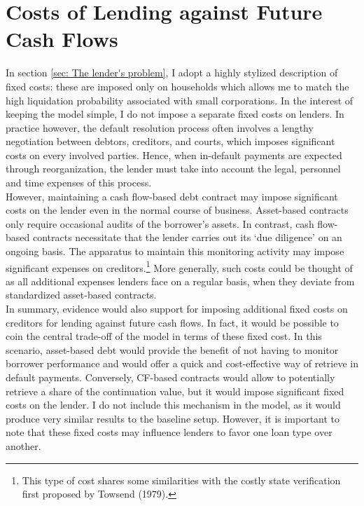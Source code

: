 \documentclass[12pt]{article}
\begin{document}
\section{Costs of Lending against Future Cash Flows \label{sec:fixed costs}}
In section \ref{sec: The lender's problem}, I adopt a highly stylized description of fixed costs: these are imposed only on households which allows me to match the high liquidation probability associated with small corporations. In the interest of keeping the model simple, I do not impose a separate fixed costs on lenders. In practice however, the default resolution process often involves a lengthy negotiation between debtors, creditors, and courts, which imposes significant costs on every involved parties. Hence, when in-default payments are expected through reorganization, the lender must take into account the legal, personnel and time expenses of this process. \vspace{3mm} \\
However, maintaining a cash flow-based debt contract may impose significant costs on the lender even in the normal course of business. Asset-based contracts only require occasional audits of the borrower's assets. In contrast, cash flow-based contracts necessitate that the lender carries out its `due diligence' on an ongoing basis. The apparatus to maintain this monitoring activity may impose significant expenses on creditors.\footnote{This type of cost shares some similarities with the costly state verification first proposed by Towsend (1979).} More generally, such costs could be thought of as all additional expenses lenders face on a regular basis, when they deviate from standardized asset-based contracts.
\vspace{3mm} \\
In summary, evidence would also support for imposing additional fixed costs on creditors for lending against future cash flows. In fact, it would be possible to coin the central trade-off of the model in terms of these fixed cost. In this scenario, asset-based debt would provide the benefit of not having to monitor borrower performance and would offer a quick and cost-effective way of retrieve in default payments. Conversely, CF-based contracts would allow to potentially retrieve a share of the continuation value, but it would impose significant fixed costs on the lender. I do not include this mechanism in the model, as it would produce very similar results to the baseline setup. However, it is important to note that these fixed costs may influence lenders to favor one loan type over another.
\end{document}
